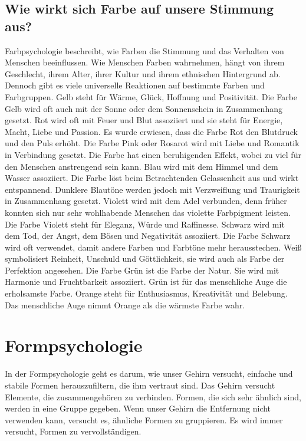 \subsection{Wie wirkt sich Farbe auf unsere Stimmung aus?}
Farbpsychologie beschreibt, wie Farben die Stimmung und das Verhalten von Menschen beeinflussen. Wie Menschen Farben wahrnehmen, hängt von ihrem Geschlecht, ihrem Alter, ihrer Kultur und ihrem ethnischen Hintergrund ab. Dennoch gibt es viele universelle Reaktionen auf bestimmte Farben und Farbgruppen. 
Gelb steht für Wärme, Glück, Hoffnung und Positivität. Die Farbe Gelb wird oft auch mit der Sonne oder dem Sonnenschein in Zusammenhang gesetzt.
Rot wird oft mit Feuer und Blut assoziiert und sie steht für Energie, Macht, Liebe und Passion. Es wurde erwiesen, dass die Farbe Rot den Blutdruck und den Puls erhöht. 
Die Farbe Pink oder Rosarot wird mit Liebe und Romantik in Verbindung gesetzt. Die Farbe hat einen beruhigenden Effekt, wobei zu viel für den Menschen anstrengend sein kann.
Blau wird mit dem Himmel und dem Wasser assoziiert. Die Farbe löst beim Betrachtenden Gelassenheit aus und wirkt entspannend. Dunklere Blautöne werden jedoch mit Verzweiflung und Traurigkeit in Zusammenhang gesetzt. 
Violett wird mit dem Adel verbunden, denn früher konnten sich nur sehr wohlhabende Menschen das violette Farbpigment leisten. Die Farbe Violett steht für Eleganz, Würde und Raffinesse. 
Schwarz wird mit dem Tod, der Angst, dem Bösen und Negativität assoziiert. Die Farbe Schwarz wird oft verwendet, damit andere Farben und Farbtöne mehr herausstechen. 
Weiß symbolisiert Reinheit, Unschuld und Göttlichkeit, sie wird auch als Farbe der Perfektion angesehen. 
Die Farbe Grün ist die Farbe der Natur. Sie wird mit Harmonie und Fruchtbarkeit assoziiert. Grün ist für das menschliche Auge die erholsamste Farbe. 
Orange steht für Enthusiasmus, Kreativität und Belebung. Das menschliche Auge nimmt Orange als die wärmste Farbe wahr. 
\cite{mollica2018special}

\section{Formpsychologie}
In der Formpsychologie geht es darum, wie unser Gehirn versucht, einfache und stabile Formen herauszufiltern, die ihm vertraut sind. Das Gehirn versucht Elemente, die zusammengehören zu verbinden. Formen, die sich sehr ähnlich sind, werden in eine Gruppe gegeben. Wenn unser Gehirn die Entfernung nicht verwenden kann, versucht es, ähnliche Formen zu gruppieren. Es wird immer versucht, Formen zu vervollständigen.
\cite{solarski2012drawing}

